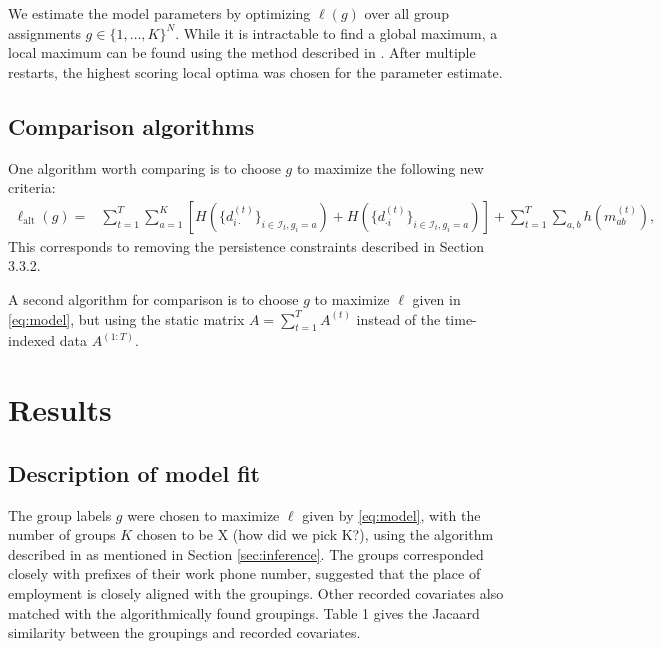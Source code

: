 \documentclass{article}
\begin{document}
We estimate the model parameters by optimizing $\ell(g)$ over all group assignments $g \in \{1,\ldots,K\}^N$. While it is intractable to find a global maximum, a local maximum can be found using the method described in \cite{karrer2011stochastic}. After multiple restarts, the highest scoring local optima was chosen for the parameter estimate.





\subsection{Comparison algorithms} \label{sec:other algorithms}

One algorithm worth comparing is to choose $g$ to maximize the following new criteria:
\begin{align} \label{eq:alternative}
\ell_{\textrm{alt}}(g) =& \sum_{t=1}^T \sum_{a=1}^K \left[ H\left(\{d_{i\cdot}^{(t)}\}_{i \in \mathcal{I}_t, g_i=a}\right) + H\left(\{d_{\cdot i}^{(t)}\}_{i \in \mathcal{I}_t, g_i=a}\right) \right] + \sum_{t=1}^T \sum_{a,b} h(m_{ab}^{(t)}),
\end{align}
This corresponds to removing the persistence constraints described in Section 3.3.2.

A second algorithm for comparison is to choose $g$ to maximize $\ell$ given in \eqref{eq:model}, but using the static matrix $A = \sum_{t=1}^T A^{(t)}$ instead of the time-indexed data $A^{(1:T)}$.

\section{Results}

\subsection{Description of model fit}
The group labels $g$ were chosen to maximize $\ell$ given by \eqref{eq:model}, with the number of groups $K$ chosen to be X (how did we pick K?), using the algorithm described in \cite{karrer2011stochastic} as mentioned in Section \ref{sec:inference}. The groups corresponded closely with prefixes of their work phone number, suggested that the place of employment is closely aligned with the groupings. Other recorded covariates also matched with the algorithmically found groupings. Table 1 gives the Jacaard similarity between the groupings and recorded covariates. 
\end{document}
